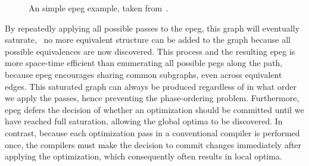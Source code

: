 \begin{figure}[ht]
    \caption{%
        An simple \gls{epeg} example, taken from~\cite{tate09}.
    }\label{bg:fig:epeg}
\end{figure}

By repeatedly applying all possible passes to the \gls{epeg}, this graph will
eventually saturate, \ie~no more equivalent structure can be added to the graph
because all possible equivalences are now discovered.  This process and the
resulting \gls{epeg} is more space-time efficient than enumerating all possible
\glspl{peg} along the path, because \gls{epeg} encourages sharing common
subgraphs, even across equivalent edges.  This saturated graph can always be
produced regardless of in what order we apply the passes, hence preventing
the phase-ordering problem.  Furthermore, \gls{epeg} defers the decision
of whether an optimization should be committed until we have reached full
saturation, allowing the global optima to be discovered.  In contrast, because
each optimization pass in a conventional compiler is performed once, the
compilers must make the decision to commit changes immediately after applying
the optimization, which consequently often results in local optima.
